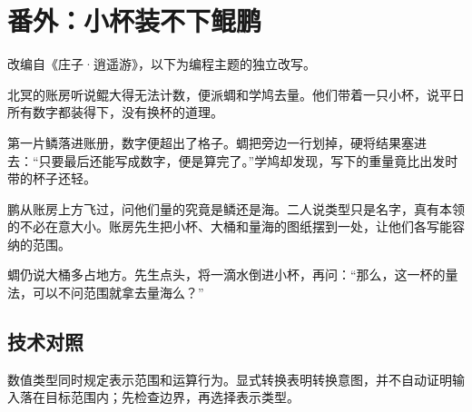 \section{番外：小杯装不下鲲鹏}

改编自《庄子·逍遥游》，以下为编程主题的独立改写。

北冥的账房听说鲲大得无法计数，便派蜩和学鸠去量。他们带着一只小杯，说平日所有数字都装得下，没有换杯的道理。

第一片鳞落进账册，数字便超出了格子。蜩把旁边一行划掉，硬将结果塞进去：“只要最后还能写成数字，便是算完了。”学鸠却发现，写下的重量竟比出发时带的杯子还轻。

鹏从账房上方飞过，问他们量的究竟是鳞还是海。二人说类型只是名字，真有本领的不必在意大小。账房先生把小杯、大桶和量海的图纸摆到一处，让他们各写能容纳的范围。

蜩仍说大桶多占地方。先生点头，将一滴水倒进小杯，再问：“那么，这一杯的量法，可以不问范围就拿去量海么？”

\subsection*{技术对照}

数值类型同时规定表示范围和运算行为。显式转换表明转换意图，并不自动证明输入落在目标范围内；先检查边界，再选择表示类型。
